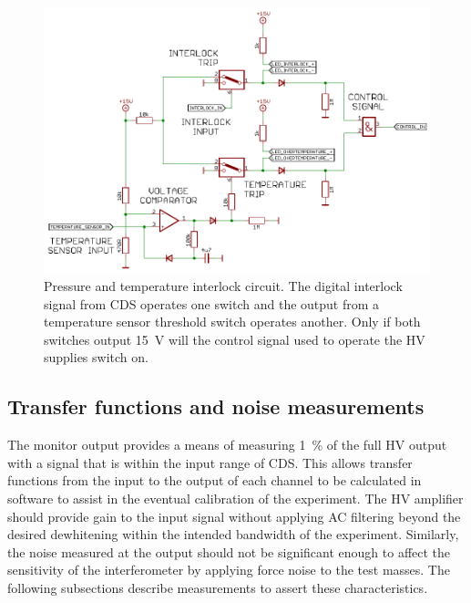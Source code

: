 \begin{figure}
  \centering
  \includegraphics[width=\columnwidth]{graphics/60-hv-amp-interlock.pdf}
  \caption[High voltage amplifier interlock schematic]{\label{fig:hv-amp-interlock}Pressure and temperature interlock circuit. The digital interlock signal from \gls{CDS} operates one switch and the output from a temperature sensor threshold switch operates another. Only if both switches output \SI{15}{\volt} will the control signal used to operate the \gls{HV} supplies switch on.}
\end{figure}

\subsection{Transfer functions and noise measurements}
The monitor output provides a means of measuring \SI{1}{\percent} of the full \gls{HV} output with a signal that is within the input range of \gls{CDS}. This allows transfer functions from the input to the output of each channel to be calculated in software to assist in the eventual calibration of the experiment. The \gls{HV} amplifier should provide gain to the input signal without applying \gls{AC} filtering beyond the desired dewhitening within the intended bandwidth of the experiment. Similarly, the noise measured at the output should not be significant enough to affect the sensitivity of the interferometer by applying force noise to the test masses. The following subsections describe measurements to assert these characteristics.

